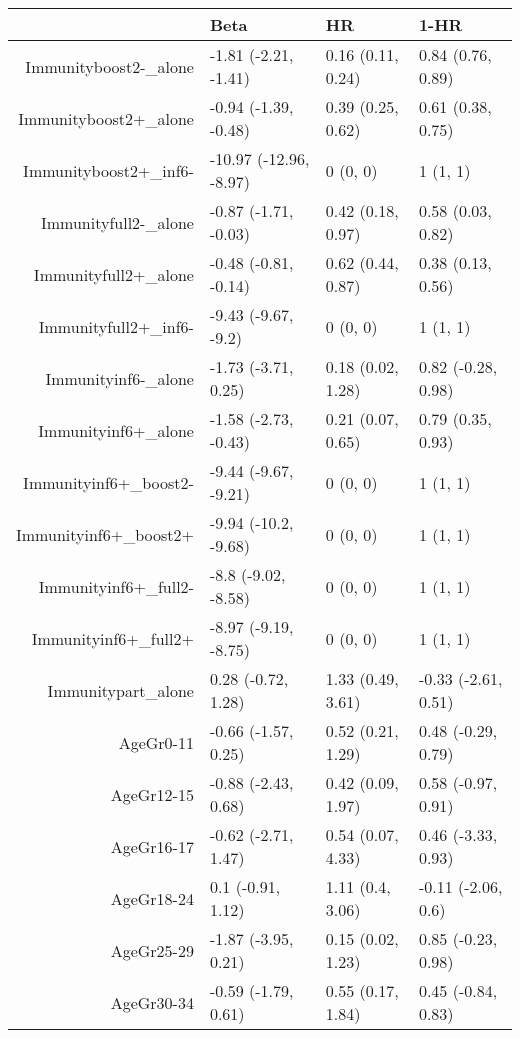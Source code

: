 \begin{table}[ht]
\centering
\begin{tabular}{rlll}
  \hline
 & Beta & HR & 1-HR \\ 
  \hline
Immunityboost2-\_alone & -1.81 (-2.21, -1.41) & 0.16 (0.11, 0.24) & 0.84 (0.76, 0.89) \\ 
  Immunityboost2+\_alone & -0.94 (-1.39, -0.48) & 0.39 (0.25, 0.62) & 0.61 (0.38, 0.75) \\ 
  Immunityboost2+\_inf6- & -10.97 (-12.96, -8.97) & 0 (0, 0) & 1 (1, 1) \\ 
  Immunityfull2-\_alone & -0.87 (-1.71, -0.03) & 0.42 (0.18, 0.97) & 0.58 (0.03, 0.82) \\ 
  Immunityfull2+\_alone & -0.48 (-0.81, -0.14) & 0.62 (0.44, 0.87) & 0.38 (0.13, 0.56) \\ 
  Immunityfull2+\_inf6- & -9.43 (-9.67, -9.2) & 0 (0, 0) & 1 (1, 1) \\ 
  Immunityinf6-\_alone & -1.73 (-3.71, 0.25) & 0.18 (0.02, 1.28) & 0.82 (-0.28, 0.98) \\ 
  Immunityinf6+\_alone & -1.58 (-2.73, -0.43) & 0.21 (0.07, 0.65) & 0.79 (0.35, 0.93) \\ 
  Immunityinf6+\_boost2- & -9.44 (-9.67, -9.21) & 0 (0, 0) & 1 (1, 1) \\ 
  Immunityinf6+\_boost2+ & -9.94 (-10.2, -9.68) & 0 (0, 0) & 1 (1, 1) \\ 
  Immunityinf6+\_full2- & -8.8 (-9.02, -8.58) & 0 (0, 0) & 1 (1, 1) \\ 
  Immunityinf6+\_full2+ & -8.97 (-9.19, -8.75) & 0 (0, 0) & 1 (1, 1) \\ 
  Immunitypart\_alone & 0.28 (-0.72, 1.28) & 1.33 (0.49, 3.61) & -0.33 (-2.61, 0.51) \\ 
  AgeGr0-11 & -0.66 (-1.57, 0.25) & 0.52 (0.21, 1.29) & 0.48 (-0.29, 0.79) \\ 
  AgeGr12-15 & -0.88 (-2.43, 0.68) & 0.42 (0.09, 1.97) & 0.58 (-0.97, 0.91) \\ 
  AgeGr16-17 & -0.62 (-2.71, 1.47) & 0.54 (0.07, 4.33) & 0.46 (-3.33, 0.93) \\ 
  AgeGr18-24 & 0.1 (-0.91, 1.12) & 1.11 (0.4, 3.06) & -0.11 (-2.06, 0.6) \\ 
  AgeGr25-29 & -1.87 (-3.95, 0.21) & 0.15 (0.02, 1.23) & 0.85 (-0.23, 0.98) \\ 
  AgeGr30-34 & -0.59 (-1.79, 0.61) & 0.55 (0.17, 1.84) & 0.45 (-0.84, 0.83) \\ 

\end{tabular}
\end{table}
